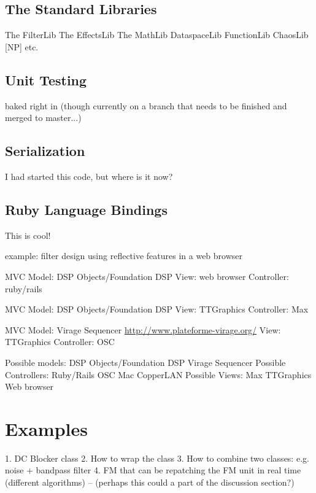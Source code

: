\documentclass[twoside,10pt]{article}
\begin{document}
\subsection{The Standard Libraries}

The FilterLib
The EffectsLib
The MathLib
DataspaceLib
FunctionLib 
ChaosLib [NP]
etc.

\subsection{Unit Testing}

baked right in (though currently on a branch that needs to be finished and merged to master...)


\subsection{Serialization}

I had started this code, but where is it now?


\subsection{Ruby Language Bindings}

This is cool!

example: filter design using reflective features in a web browser

MVC
    Model: DSP Objects/Foundation DSP
    View: web browser
    Controller: ruby/rails

MVC
    Model: DSP Objects/Foundation DSP
    View: TTGraphics
    Controller: Max

MVC
    Model: Virage Sequencer \url{http://www.plateforme-virage.org/}
    View: TTGraphics
    Controller: OSC
    
    
Possible models:
    DSP Objects/Foundation DSP
    Virage Sequencer
Possible Controllers:
    Ruby/Rails
    OSC
    Mac
    CopperLAN
Possible Views:
    Max
    TTGraphics
    Web browser





\section{Examples} %

1. DC Blocker class
2. How to wrap the class
3. How to combine two classes: e.g. noise + bandpass filter
4. FM that can be repatching the FM unit in real time (different algorithms)  -- (perhaps this could a part of the discussion section?) 
\end{document}
